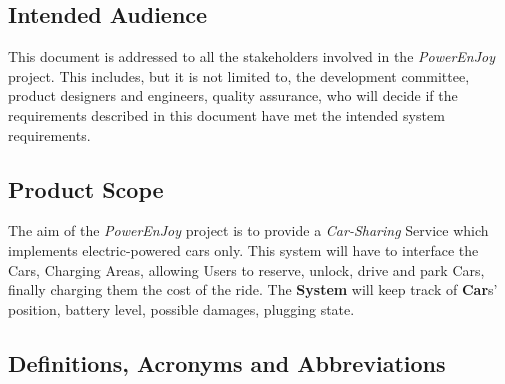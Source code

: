 \subsection{Intended Audience}
This document is addressed to all the stakeholders involved in the \emph{PowerEnJoy} project. This includes, but it is not limited to, the development committee, product designers and engineers, quality assurance, who will decide if the requirements described in this document have met the intended system requirements.

\subsection{Product Scope}
The aim of the \emph{PowerEnJoy} project is to provide a \textit{Car-Sharing} Service which implements electric-powered cars only.
This system will have to interface the Cars, Charging Areas, allowing Users to reserve, unlock, drive and park Cars, finally charging them the cost of the ride. 
The \textbf{System} will keep track of \textbf{Car}s' position, battery level, possible damages, plugging state.

\subsection{Definitions, Acronyms and Abbreviations}
